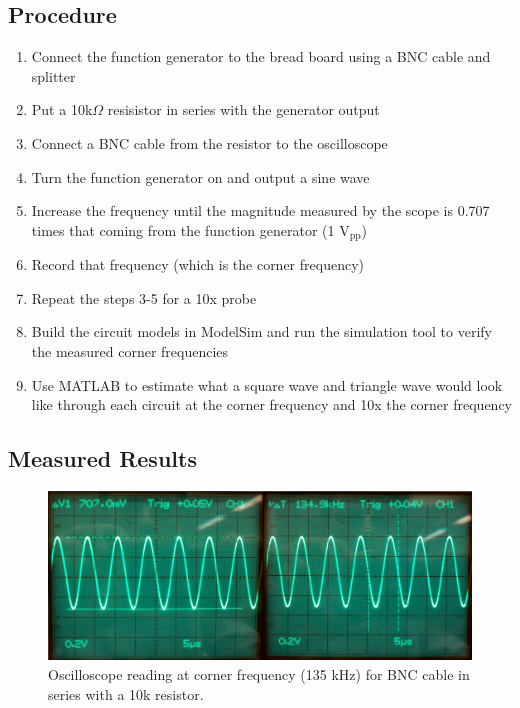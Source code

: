 \documentclass[12pt,letterpaper]{report}
\begin{document}
\subsection*{Procedure}
\begin{enumerate}
	\item Connect the function generator to the bread board using a BNC cable and splitter
	\item Put a 10k$\Omega$ resisistor in series with the generator output
	\item Connect a BNC cable from the resistor to the oscilloscope
	\item Turn the function generator on and output a sine wave
	\item Increase the frequency until the magnitude measured by the scope is 0.707 times that coming from the function generator (1 $\text{V}_{\text{pp}}$)
	\item Record that frequency (which is the corner frequency)
	\item Repeat the steps 3-5 for a 10x probe
	\item Build the circuit models in ModelSim and run the simulation tool to verify the measured corner frequencies
	\item Use MATLAB to estimate what a square wave and triangle wave would look like through each circuit at the corner frequency and 10x the corner frequency
\end{enumerate}

\subsection*{Measured Results}

\begin{figure}
	\centering
	\includegraphics[width=\linewidth, keepaspectratio=true]{lab1_images/BNC_sine_corner.png} 
	\caption{Oscilloscope reading at corner frequency (135 kHz) for BNC cable in series with a 10k resistor. }
	\label{fig:bnc_corner}
\end{figure}
\end{document}
